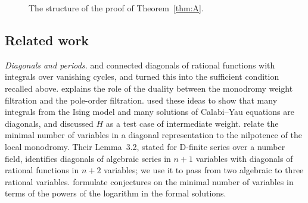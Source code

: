 \documentclass[11pt]{amsart}
\theoremstyle{definition}
\theoremstyle{remark}
\numberwithin{equation}{section}
\newcommand{\PP}{\mathbb{P}}
\newcommand{\Fab}{F_{a,b}}
\begin{document}
\begin{figure}[ht]
\centering
{}
\caption{The structure of the proof of Theorem~\ref{thm:A}.}\label{fig:strategy}
\end{figure}

\subsection{Related work}
\emph{Diagonals and periods.} \citet{Christol1985} and \citet{Deligne1984} connected diagonals of rational functions with integrals over vanishing cycles, and \citet[Theorem~12]{Christol1990} turned this into the sufficient condition recalled above. \citet[\S4.2]{Christol2015} explains the role of the duality between the monodromy weight filtration and the pole-order filtration. \citet{BostanEtAl2013} used these ideas to show that many integrals from the Ising model and many solutions of Calabi--Yau equations are diagonals, and discussed $H$ as a test case of intermediate weight. \citet{HarderKramerMiller2026} relate the minimal number of variables in a diagonal representation to the nilpotence of the local monodromy. Their Lemma~3.2, stated for D-finite series over a number field, identifies diagonals of algebraic series in $n+1$ variables with diagonals of rational functions in $n+2$ variables; we use it to pass from two algebraic to three rational variables. \citet{HassaniMaillardZenine2025} formulate conjectures on the minimal number of variables in terms of the powers of the logarithm in the formal solutions.
\end{document}
